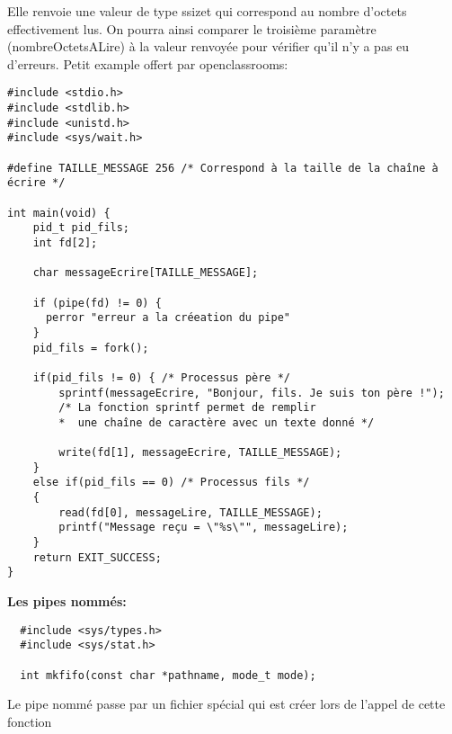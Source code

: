 \documentclass[a4paper]{article}
\begin{document}
Elle renvoie une valeur de type ssize\textunderscore{}t qui correspond au nombre d'octets effectivement lus. On pourra ainsi comparer le troisième paramètre (nombreOctetsALire) à la valeur renvoyée pour vérifier qu'il n'y a pas eu d'erreurs.\newpage
Petit example offert par openclassrooms:
\begin{lstlisting}
#include <stdio.h>
#include <stdlib.h>
#include <unistd.h>
#include <sys/wait.h>

#define TAILLE_MESSAGE 256 /* Correspond à la taille de la chaîne à écrire */

int main(void) {
    pid_t pid_fils;
    int fd[2];

    char messageEcrire[TAILLE_MESSAGE];

    if (pipe(fd) != 0) {
      perror "erreur a la créeation du pipe"
    }
    pid_fils = fork();

    if(pid_fils != 0) { /* Processus père */
        sprintf(messageEcrire, "Bonjour, fils. Je suis ton père !");
        /* La fonction sprintf permet de remplir
        *  une chaîne de caractère avec un texte donné */

        write(fd[1], messageEcrire, TAILLE_MESSAGE);
    }
    else if(pid_fils == 0) /* Processus fils */
    {
        read(fd[0], messageLire, TAILLE_MESSAGE);
        printf("Message reçu = \"%s\"", messageLire);
    }
    return EXIT_SUCCESS;
}
\end{lstlisting}
\textbf{Les pipes nommés:}
\begin{lstlisting}
  #include <sys/types.h>
  #include <sys/stat.h>
  
  int mkfifo(const char *pathname, mode_t mode);
\end{lstlisting}
Le pipe nommé passe par un fichier spécial qui est créer lors de l'appel de cette fonction
\end{document}
